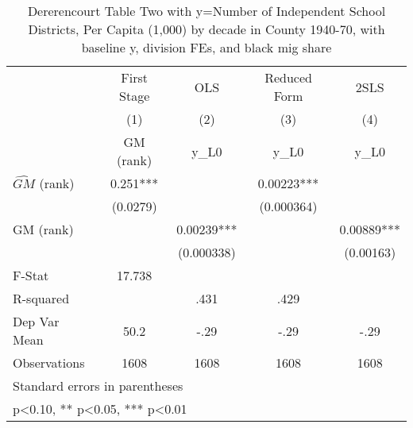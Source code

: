 \begin{table}[htbp]\centering
\def\sym#1{\ifmmode^{#1}\else\(^{#1}\)\fi}
\caption{Dererencourt Table Two with y=Number of Independent School Districts, Per Capita (1,000) by decade in County 1940-70, with baseline y, division FEs, and black mig share}
\begin{tabular}{l*{4}{c}}
\toprule
                    & First Stage   &         OLS   &Reduced Form   &        2SLS   \\
                    &\multicolumn{1}{c}{(1)}&\multicolumn{1}{c}{(2)}&\multicolumn{1}{c}{(3)}&\multicolumn{1}{c}{(4)}\\
                    &\multicolumn{1}{c}{GM  (rank)}&\multicolumn{1}{c}{y\_L0}&\multicolumn{1}{c}{y\_L0}&\multicolumn{1}{c}{y\_L0}\\
\midrule
$\hat{GM}$ (rank)   &       0.251***&               &     0.00223***&               \\
                    &    (0.0279)   &               &  (0.000364)   &               \\
\addlinespace
GM  (rank)          &               &     0.00239***&               &     0.00889***\\
                    &               &  (0.000338)   &               &   (0.00163)   \\
\midrule
F-Stat              &      17.738   &               &               &               \\
R-squared           &               &        .431   &        .429   &               \\
Dep Var Mean        &        50.2   &        -.29   &        -.29   &        -.29   \\
Observations        &        1608   &        1608   &        1608   &        1608   \\
\bottomrule
\multicolumn{5}{l}{\footnotesize Standard errors in parentheses}\\
\multicolumn{5}{l}{\footnotesize * p<0.10, ** p<0.05, *** p<0.01}\\
\end{tabular}
\end{table}
